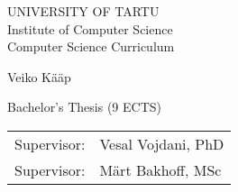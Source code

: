 \documentclass{style/bachelor-thesis}
\begin{document}
\thispagestyle{empty}
\begin{center}

\large
UNIVERSITY OF TARTU\\[2mm]
Institute of Computer Science\\
Computer Science Curriculum\\[2mm]

\vspace{25mm}

\Large Veiko Kääp

\vspace{4mm}

\huge \articleName

\vspace{20mm}

\Large Bachelor's Thesis (9 ECTS)

\end{center}

\vspace{2mm}

\begin{flushright}
 {
 \setlength{\extrarowheight}{5pt}
 \begin{tabular}{r l} 
  \sffamily Supervisor: & \sffamily Vesal Vojdani, PhD \\
  \sffamily Supervisor: & \sffamily Märt Bakhoff, MSc
 \end{tabular}
 }
\end{flushright}

\vspace{10mm}

\vspace{2mm}



\vspace{2mm}


\vspace{8mm}
\end{document}
